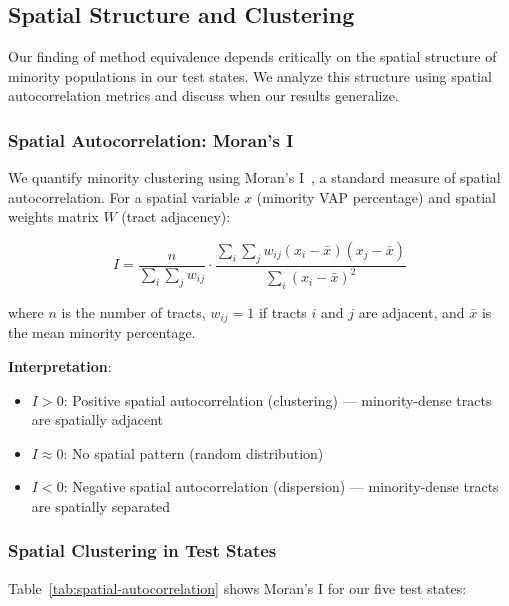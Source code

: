 \subsection{Spatial Structure and Clustering}
\label{sec:spatial-structure}

Our finding of method equivalence depends critically on the spatial structure of minority populations in our test states. We analyze this structure using spatial autocorrelation metrics and discuss when our results generalize.

\subsubsection{Spatial Autocorrelation: Moran's I}

We quantify minority clustering using Moran's I~\cite{moran1950notes}, a standard measure of spatial autocorrelation. For a spatial variable $x$ (minority VAP percentage) and spatial weights matrix $W$ (tract adjacency):

\[
I = \frac{n}{\sum_i \sum_j w_{ij}} \cdot \frac{\sum_i \sum_j w_{ij}(x_i - \bar{x})(x_j - \bar{x})}{\sum_i (x_i - \bar{x})^2}
\]

where $n$ is the number of tracts, $w_{ij} = 1$ if tracts $i$ and $j$ are adjacent, and $\bar{x}$ is the mean minority percentage.

\textbf{Interpretation}:
\begin{itemize}
    \item $I > 0$: Positive spatial autocorrelation (clustering) --- minority-dense tracts are spatially adjacent
    \item $I \approx 0$: No spatial pattern (random distribution)
    \item $I < 0$: Negative spatial autocorrelation (dispersion) --- minority-dense tracts are spatially separated
\end{itemize}

\subsubsection{Spatial Clustering in Test States}

Table~\ref{tab:spatial-autocorrelation} shows Moran's I for our five test states:

